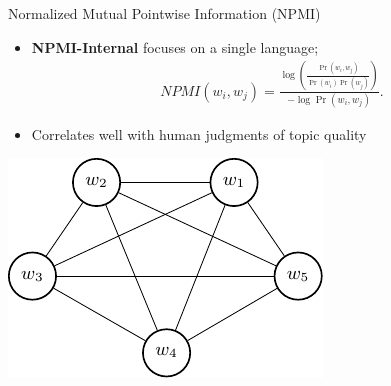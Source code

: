 \documentclass[compress]{beamer}
\begin{document}
		\begin{frame}{Normalized Mutual Pointwise Information (NPMI)}
			\begin{itemize}
				\item \textbf{NPMI-Internal} focuses on a single language;
					\begin{align}
					NPMI(w_i,w_j)=\frac{\log\left(\frac{\Pr(w_i,w_j)}{\Pr(w_i)\Pr(w_j)}\right)}{-\log\Pr(w_i,w_j)}.
					\end{align}
			\item Correlates well with human judgments of
                          topic quality
			\end{itemize}
			\begin{center}
				\includegraphics[height=0.3\textheight]{multilingual_itm/npmi-internal.pdf}
			\end{center}
		\end{frame}
\end{document}
